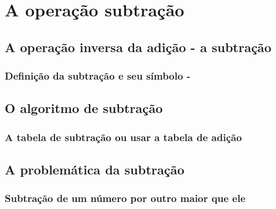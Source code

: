 \chapter[A operação subtração]{A operação subtração}

\section{A operação inversa da adição - a subtração}

\subsection{Definição da subtração e seu símbolo -}

\section{O algoritmo de subtração}

\subsection{A tabela de subtração ou usar a tabela de adição}

\section{A problemática da subtração}

\subsection{Subtração de um número por outro maior que ele}

